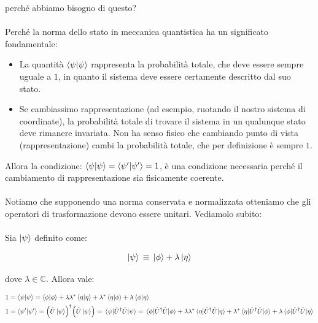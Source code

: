 	perché abbiamo bisogno di questo?
	\\
	\\
	Perché la norma dello stato in meccanica quantistica ha un significato fondamentale:
	
\begin{itemize}
	
	\item La quantità $\braket{\psi}$ rappresenta la probabilità totale, che deve essere sempre uguale a $1$, in quanto il sistema deve essere certamente descritto dal suo stato.
	
	\item Se cambiassimo rappresentazione (ad esempio, ruotando il nostro sistema di coordinate), la probabilità totale di trovare il sistema in un qualunque stato deve rimanere invariata. Non ha senso fisico che cambiando punto di vista (rappresentazione) cambi la probabilità totale, che per definizione è sempre $1$.

\end{itemize}

	Allora la condizione: $\braket{\psi} = \braket{\psi'} = 1$, è una condizione necessaria perché il cambiamento di rappresentazione sia fisicamente coerente.
	\\
	\\
	 Notiamo che supponendo una norma conservata e normalizzata otteniamo che gli operatori di trasformazione devono essere unitari. Vediamolo subito:
	\\
	\\
	Sia $\ket{\psi}$ definito come:
	
\begin{align*}
	\ket{\psi} \, \equiv \, \ket{\phi} + \lambda \ket{\eta}
\end{align*}

	dove $\lambda \in \mathbb{C}$. Allora vale:
	
\begin{align*}
	& 1 = \braket{\psi} = \braket{\phi} + \lambda \lambda^* \braket{\eta} + \lambda^* \braket{\eta}{\phi} + \lambda\braket{\phi}{\eta} \\
	& 1 = \braket{\psi'} = \qty(\hat{U} \ket{\psi})^{\dagger}  \qty(\hat{U} \ket{\psi}) = \mel{\psi}{\hat{U}^{\dagger}\hat{U}}{\psi} =  \mel{\phi}{\hat{U}^{\dagger}\hat{U}}{\phi} + \lambda \lambda^* \mel{\eta}{\hat{U}^{\dagger}\hat{U}}{\eta} + \lambda^* \mel{\eta}{\hat{U}^{\dagger}\hat{U}}{\phi} + \lambda \mel{\phi}{\hat{U}^{\dagger}\hat{U}}{\eta}
\end{align*}
 
